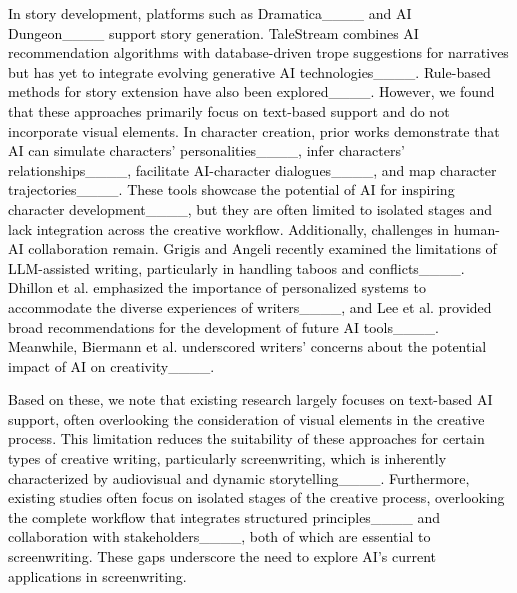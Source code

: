
\textcolor{black}{In story development, platforms such as Dramatica____ and AI Dungeon____ support story generation. TaleStream combines AI recommendation algorithms with database-driven trope suggestions for narratives but has yet to integrate evolving generative AI technologies____. Rule-based methods for story extension have also been explored____. However, we found that these approaches primarily focus on text-based support and do not incorporate visual elements. In character creation, prior works demonstrate that AI can simulate characters' personalities____, infer characters' relationships____, facilitate AI-character dialogues____, and map character trajectories____. These tools showcase the potential of AI for inspiring character development____, but they are often limited to isolated stages and lack integration across the creative workflow. Additionally, challenges in human-AI collaboration remain. Grigis and Angeli recently examined the limitations of LLM-assisted writing, particularly in handling taboos and conflicts____. Dhillon et al. emphasized the importance of personalized systems to accommodate the diverse experiences of writers____, and Lee et al. provided broad recommendations for the development of future AI tools____. Meanwhile, Biermann et al. underscored writers’ concerns about the potential impact of AI on creativity____.}

\textcolor{black}{Based on these, we note that existing research largely focuses on text-based AI support, often overlooking the consideration of visual elements in the creative process. 
This limitation reduces the suitability of these approaches for certain types of creative writing, particularly screenwriting, which is inherently characterized by audiovisual and dynamic storytelling____. Furthermore, existing studies often focus on isolated stages of the creative process, overlooking the complete workflow that integrates structured principles____ and collaboration with stakeholders____, both of which are essential to screenwriting. These gaps underscore the need to explore AI's current applications in screenwriting.}


